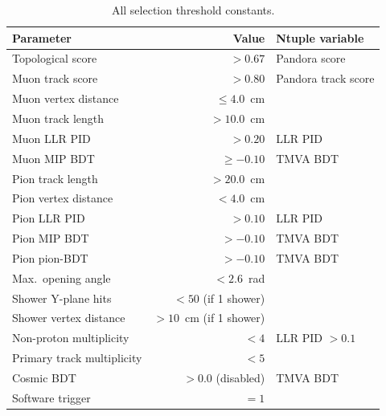 \documentclass[11pt,a4paper]{article}
\begin{document}
\begin{table}[H]
  \centering
  \caption{All selection threshold constants.}
  \label{tab:cutparams}
  \begin{tabular}{lrl}
    \toprule
    Parameter & Value & Ntuple variable \\
    \midrule
    Topological score           & $>0.67$        & Pandora score \\
    Muon track score            & $>0.80$        & Pandora track score \\
    Muon vertex distance        & $\leq 4.0$~cm  & \\
    Muon track length           & $>10.0$~cm     & \\
    Muon LLR PID                & $>0.20$        & LLR PID \\
    Muon MIP BDT                & $\geq-0.10$    & TMVA BDT \\
    Pion track length           & $>20.0$~cm     & \\
    Pion vertex distance        & $<4.0$~cm      & \\
    Pion LLR PID                & $>0.10$        & LLR PID \\
    Pion MIP BDT                & $>-0.10$       & TMVA BDT \\
    Pion pion-BDT               & $>-0.10$       & TMVA BDT \\
    Max.\ opening angle         & $<2.6$~rad     & \\
    Shower Y-plane hits         & $<50$ (if 1 shower) & \\
    Shower vertex distance      & $>10$~cm (if 1 shower) & \\
    Non-proton multiplicity     & $<4$           & LLR PID $>0.1$ \\
    Primary track multiplicity  & $<5$           & \\
    Cosmic BDT                  & $>0.0$ (disabled) & TMVA BDT \\
    Software trigger            & $=1$           & \\
    \bottomrule
  \end{tabular}
\end{table}
\end{document}
